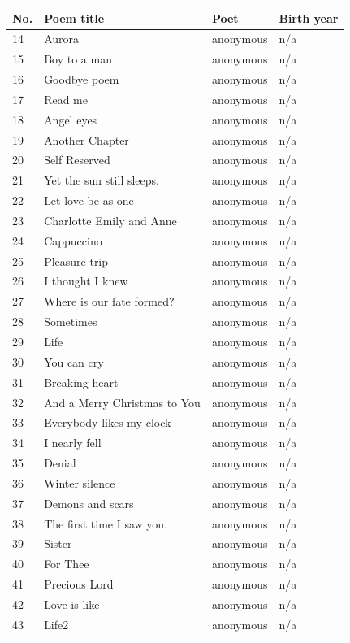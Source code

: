 \documentclass{book}
\begin{document}
\begin{table}
\tiny
\begin{tabular}{llll}
\toprule
No. & Poem title & Poet & Birth year \\
\midrule
14 & Aurora & anonymous & n/a \\
15 & Boy to a man & anonymous & n/a \\
16 & Goodbye poem & anonymous & n/a \\
17 & Read me & anonymous & n/a \\
18 & Angel eyes & anonymous & n/a \\
19 & Another Chapter & anonymous & n/a \\
20 & Self Reserved & anonymous & n/a \\
21 & Yet the sun still sleeps.  & anonymous & n/a \\
22 & Let love be as one & anonymous & n/a \\
23 & Charlotte Emily and Anne & anonymous & n/a \\
24 & Cappuccino & anonymous & n/a \\
25 & Pleasure trip & anonymous & n/a \\
26 & I thought I knew & anonymous & n/a \\
27 & Where is our fate formed? & anonymous & n/a \\
28 & Sometimes & anonymous & n/a \\
29 & Life & anonymous & n/a \\
30 & You can cry & anonymous & n/a \\
31 & Breaking heart & anonymous & n/a \\
32 & And a Merry Christmas to You & anonymous & n/a \\
33 & Everybody likes my clock & anonymous & n/a \\
34 & I nearly fell & anonymous & n/a \\
35 & Denial & anonymous & n/a \\
36 & Winter silence & anonymous & n/a \\
37 & Demons and scars & anonymous & n/a \\
38 & The first time I saw you.  & anonymous & n/a \\
39 & Sister & anonymous & n/a \\
40 & For Thee & anonymous & n/a \\
41 & Precious Lord & anonymous & n/a \\
42 & Love is like & anonymous & n/a \\
43 & Life2 & anonymous & n/a \\

\end{tabular}
\end{table}
\end{document}
